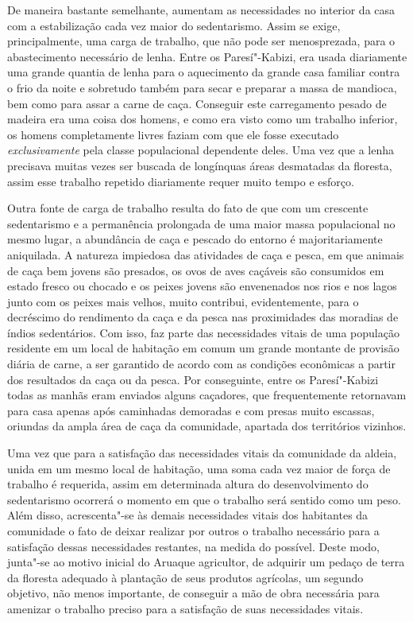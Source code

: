 De maneira bastante semelhante, aumentam as necessidades no interior da
casa com a estabilização cada vez maior do sedentarismo. Assim se exige,
principalmente, uma carga de trabalho, que não pode ser menosprezada,
para o abastecimento necessário de lenha. Entre os Paresí"-Kabizi, era
usada diariamente uma grande quantia de lenha para o aquecimento da
grande casa familiar contra o frio da noite e sobretudo também para
secar e preparar a massa de mandioca, bem como para assar a carne de
caça. Conseguir este carregamento pesado de madeira era uma coisa dos
homens, e como era visto como um trabalho inferior, os homens
completamente livres faziam com que ele fosse executado \textit{exclusivamente}
pela classe populacional dependente deles. Uma vez que a lenha
precisava muitas vezes ser buscada de longínquas áreas desmatadas da
floresta, assim esse trabalho repetido diariamente requer muito tempo e
esforço.

Outra fonte de carga de trabalho resulta do fato de que com um crescente
sedentarismo e a permanência prolongada de uma maior massa populacional
no mesmo lugar, a abundância de caça e pescado do entorno é
majoritariamente aniquilada. A natureza impiedosa das atividades de caça
e pesca, em que animais de caça bem jovens são presados, os ovos de
aves caçáveis são consumidos em estado fresco ou chocado e os peixes
jovens são envenenados nos rios e nos lagos junto com os peixes mais
velhos, muito contribui, evidentemente, para o decréscimo do rendimento da
caça e da pesca nas proximidades das moradias de índios sedentários.
Com isso, faz parte das necessidades vitais de uma população
residente em um local de habitação em comum um grande montante de
provisão diária de carne, a ser garantido de acordo com as
condições econômicas a partir dos resultados da caça ou da pesca. Por
conseguinte, entre os Paresí"-Kabizi todas as manhãs eram enviados
alguns caçadores, que frequentemente retornavam para casa apenas após
caminhadas demoradas e com presas muito escassas, oriundas da ampla
área de caça da comunidade, apartada dos territórios vizinhos.

Uma vez que para a satisfação das necessidades vitais da comunidade da
aldeia, unida em um mesmo local de habitação, uma soma cada vez maior de
força de trabalho é requerida, assim em determinada altura do
desenvolvimento do sedentarismo ocorrerá o momento em que o trabalho
será sentido como um peso. Além disso, acrescenta"-se às demais
necessidades vitais dos habitantes da comunidade o fato de
deixar realizar por outros o trabalho necessário para a satisfação
dessas necessidades restantes, na medida do possível. Deste modo,
junta"-se ao motivo inicial do Aruaque agricultor, de adquirir um pedaço
de terra da floresta adequado à plantação de seus produtos agrícolas, um
segundo objetivo, não menos importante, de conseguir a mão de obra
necessária para amenizar o trabalho preciso para a satisfação de suas
necessidades vitais.

